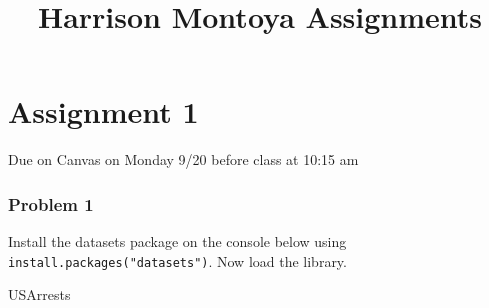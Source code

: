 \documentclass[
]{article}
\title{Harrison Montoya Assignments}
\author{}
\date{\vspace{-2.5em}}
\newenvironment{Shaded}{\begin{snugshade}}{\end{snugshade}}
\newcommand{\NormalTok}[1]{#1}
\begin{document}
\maketitle

\hypertarget{assignment-1}{%
\section{Assignment 1}\label{assignment-1}}

Due on Canvas on Monday 9/20 before class at 10:15 am

\hypertarget{problem-1}{%
\subsubsection{Problem 1}\label{problem-1}}

Install the datasets package on the console below using
\texttt{install.packages("datasets")}. Now load the library.

\begin{Shaded}
\begin{Highlighting}[]
\NormalTok{USArrests}
\end{Highlighting}
\end{Shaded}
\end{document}
